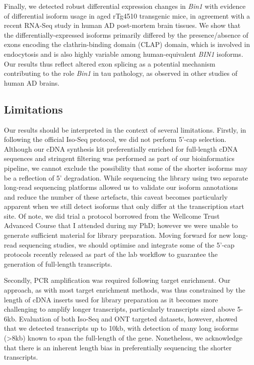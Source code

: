 Finally, we detected robust differential expression changes in \textit{Bin1} with evidence of differential isoform usage in aged rTg4510 transgenic mice, in agreement with a recent RNA-Seq study in human AD post-mortem brain tissues\cite{Marques-Coelho2021}. We show that the differentially-expressed isoforms primarily differed by the presence/absence of exons encoding the clathrin-binding domain (CLAP) domain, which is involved in endocytosis and is also highly variable among human-equivalent \textit{BIN1} isoforms\cite{Taga2020}. Our results thus reflect altered exon splicing as a potential mechanism contributing to the role \textit{Bin1} in tau pathology, as observed in other studies of human AD brains\cite{Marques-Coelho2021, Taga2020}.  


\subsection{Limitations}
Our results should be interpreted in the context of several limitations. Firstly, in following the official Iso-Seq protocol, we did not perform 5'-cap selection. Although our cDNA synthesis kit preferentially enriched for full-length cDNA sequences and stringent filtering was performed as part of our bioinformatics pipeline, we cannot exclude the possibility that some of the shorter isoforms may be a reflection of 5' degradation. While sequencing the library using two separate long-read sequencing platforms allowed us to validate our isoform annotations and reduce the number of these artefacts, this caveat becomes particularly apparent when we still detect isoforms that only differ at the transcription start site. Of note, we did trial a protocol borrowed from the Wellcome Trust Advanced Course that I attended during my PhD; however we were unable to generate sufficient material for library preparation. Moving forward for new long-read sequencing studies, we should optimise and integrate some of the 5'-cap protocols recently released \cite{Kuo2020,Jiang2019} as part of the lab workflow to guarantee the generation of full-length transcripts.   

Secondly, PCR amplification was required following target enrichment. Our approach, as with most target enrichment methods, was thus constrained by the length of cDNA inserts used for library preparation as it becomes more challenging to amplify longer transcripts, particularly transcripts sized above 5-6kb\cite{Sheynkman2020}. Evaluation of both Iso-Seq and ONT targeted datasets, however, showed that we detected transcripts up to 10kb, with detection of many long isoforms (>8kb) known to span the full-length of the gene. Nonetheless, we acknowledge that there is an inherent length bias in preferentially sequencing the shorter transcripts. 

